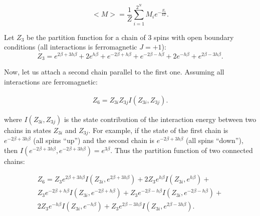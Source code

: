 \documentclass[preprint,12pt]{elsarticle}
\begin{document}
	\begin{equation}
		<M> = \frac{1}{Z} \sum_{i = 1}^{2^N} M_i e^{-\frac{E_i}{kT}}.
		\label{magnetisation}
	\end{equation}
	
	Let $Z_3$ be the partition function for a chain of 3 spins with open boundary conditions (all interactions is ferromagnetic $J = +1$):
		\begin{equation}
		Z_3 = e^{2\beta + 3h\beta} + 2e^{h\beta} + e^{- 2\beta + h\beta } + e^{- 2\beta -h\beta}  + 2e^{-h\beta} + e^{2\beta - 3h\beta}.
		\label{eq:stat_3}
	\end{equation}

	Now, let us attach a second chain parallel to the first one. Assuming all interactions are ferromagnetic:
	
	\begin{equation}
		\label{eq:stat_z3}
		\begin{alignedat}{2}
			Z_6 =  Z_{3i}Z_{3j}I(Z_{3i},Z_{3j}).
		\end{alignedat}
	\end{equation}

	\noindent where $I(Z_{3i},Z_{3j})$ is the state contribution of the interaction energy between two chains in states $Z_{3i}$ and $Z_{3j}$. For example, if the state of the first chain is $e^{-2\beta+3h\beta}$ (all spins ``up'') and the second chain is $e^{-2\beta+3h\beta}$ (all spins ``down''), then $I(e^{-2\beta+3h\beta}, e^{-2\beta+3h\beta})=e^{3\beta}$. Thus the partition function of two connected chains:
	
		\begin{equation}
			\label{eq:stat_6}
			\begin{alignedat}{3}
			Z_6 = Z_{3}e^{2\beta + 3h\beta}I(Z_{3i}, e^{2\beta + 3h\beta}) + 2Z_{3}e^{h\beta}I(Z_{3i}, e^{h\beta}) + \\
			Z_{3}e^{- 2\beta + h\beta }I(Z_{3i}, e^{- 2\beta + h\beta }) + Z_{3}e^{- 2\beta -h\beta}I(Z_{3i}, e^{- 2\beta -h\beta})  + \\
			2Z_{3}e^{-h\beta}I(Z_{3i}, e^{-h\beta}) + Z_{3}e^{2\beta - 3h\beta}I(Z_{3i}, e^{2\beta - 3h\beta}).
			\end{alignedat}
		\end{equation}
	
\end{document}
